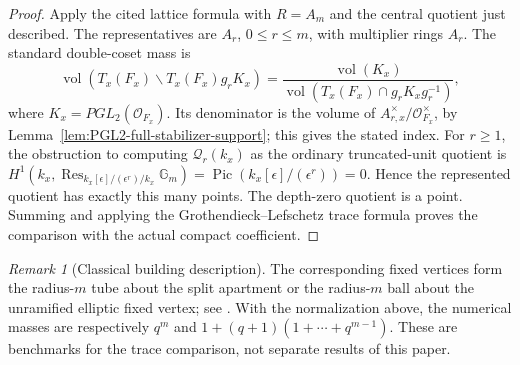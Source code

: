 \documentclass[11pt]{article}
\theoremstyle{definition}
\theoremstyle{remark}
\newtheorem{remark}[theorem]{Remark}
\begin{document}
\begin{proof}
Apply the cited lattice formula with $R=A_m$ and the central quotient
just described.  The representatives are $A_r$, $0\le r\le m$, with
multiplier rings $A_r$.  The standard double-coset mass is
\begin{equation}
 \operatorname{vol}(T_x(F_x)\backslash T_x(F_x)g_rK_x)
 =\frac{\operatorname{vol}(K_x)}
 {\operatorname{vol}(T_x(F_x)\cap g_rK_xg_r^{-1})},
 \label{eq:PGL2-double-coset-mass}
\end{equation}
where $K_x=PGL_2(\mathcal O_{F_x})$.  Its denominator is the volume of
$A_{r,x}^\times/\mathcal O_{F_x}^\times$, by
Lemma~\ref{lem:PGL2-full-stabilizer-support}; this gives the stated index.
For $r\ge1$, the obstruction to computing $\mathscr Q_r(k_x)$ as the
ordinary truncated-unit quotient is
$H^1(k_x,\operatorname{Res}_{k_x[\epsilon]/(\epsilon^r)/k_x}\mathbb G_m)
=\operatorname{Pic}(k_x[\epsilon]/(\epsilon^r))=0$.
Hence the represented quotient has exactly this many points.
The depth-zero quotient is a point.  Summing and applying the
Grothendieck--Lefschetz trace formula proves the comparison with the
actual compact coefficient.
\end{proof}

\begin{remark}[Classical building description]
\label{prop:PGL2-building-shell-verification}
The corresponding fixed vertices form the radius-$m$ tube about the split
apartment or the radius-$m$ ball about the unramified elliptic fixed vertex;
see \cite[\S\S5.8--5.9]{KottwitzOrbital}.  With the normalization above,
the numerical masses are respectively $q^m$ and
$1+(q+1)(1+\cdots+q^{m-1})$.  These are benchmarks for the trace comparison,
not separate results of this paper.
\end{remark}
\end{document}
